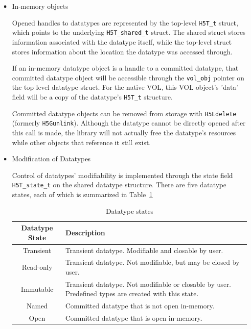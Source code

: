 \begin{itemize}
    \item In-memory objects

Opened handles to datatypes are represented by the top-level \texttt{H5T\_t} struct, which points to the underlying \texttt{H5T\_shared\_t} struct. The shared struct stores information associated with the datatype itself, while the top-level struct stores information about the location the datatype was accessed through.

If an in-memory datatype object is a handle to a committed datatype, that committed datatype object will be accessible through the \texttt{vol\_obj} pointer on the top-level datatype struct. For the native VOL, this VOL object's 'data' field will be a copy of the datatype's \texttt{H5T\_t} structure.

Committed datatype objects can be removed from storage with \texttt{H5Ldelete} (formerly \texttt{H5Gunlink}). Although the datatype cannot be directly opened after this call is made, the library will not actually free the datatype's resources while other objects that reference it still exist.

    \item Modification of Datatypes

Control of datatypes' modifiability is implemented through the state field \texttt{H5T\_state\_t} on the shared datatype structure. There are five datatype states, each of which is summarized in Table~\ref{table:datatype-states}

\begin{table}[h!]
\begin{tabular}{||c|m{}||}
\hline
\textbf{Datatype State} & \textbf{Description} \\  [0.5ex] 
\hline\hline
Transient & Transient datatype. Modifiable and closable by user. \\
\hline
Read-only & Transient datatype. Not modifiable, but may be closed by user.  \\
\hline
Immutable & Transient datatype. Not modifiable or closable by user. Predefined types are created with this state. \\
\hline
Named & Committed datatype that is not open in-memory. \\
\hline
Open & Committed datatype that is open in-memory. \\
\hline
\end{tabular}
\caption{Datatype states}
\label{table:datatype-states}
\end{table}


\end{itemize}

